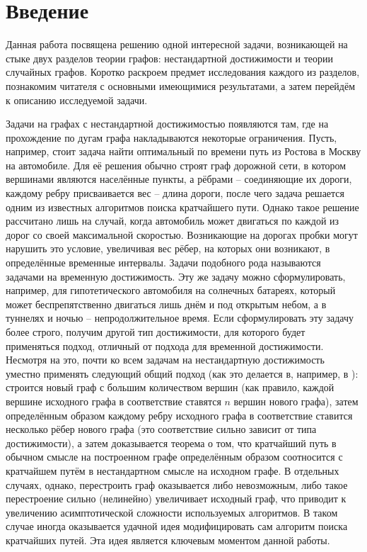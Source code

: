 \section{Введение}

Данная работа посвящена решению одной интересной задачи, возникающей на стыке двух разделов теории графов: нестандартной достижимости и теории случайных графов. Коротко раскроем предмет исследования каждого из разделов, познакомим читателя с основными имеющимися результатами, а затем перейдём к описанию исследуемой задачи.

Задачи на графах с нестандартной достижимостью появляются там, где на прохождение по дугам графа накладываются некоторые ограничения. Пусть, например, стоит задача найти оптимальный по времени путь из Ростова в Москву на автомобиле. Для её решения обычно строят граф дорожной сети, в котором вершинами являются населённые пункты, а рёбрами -- соединяющие их дороги, каждому ребру присваивается вес -- длина дороги, после чего задача решается одним из известных алгоритмов поиска кратчайшего пути. Однако такое решение рассчитано лишь на случай, когда автомобиль может двигаться по каждой из дорог со своей максимальной скоростью. Возникающие на дорогах пробки могут нарушить это условие, увеличивая вес рёбер, на которых они возникают, в определённые временные интервалы. Задачи подобного рода называются задачами на временную достижимость. Эту же задачу можно сформулировать, например, для гипотетического автомобиля на солнечных батареях, который может беспрепятственно двигаться лишь днём и под открытым небом, а в туннелях и ночью -- непродолжительное время. Если сформулировать эту задачу более строго, получим другой тип достижимости, для которого будет применяться подход, отличный от подхода для временной достижимости. Несмотря на это, почти ко всем задачам на нестандартную достижимость уместно применять следующий общий подход (как это делается в, например, в \cite{erus}): строится новый граф с большим количеством вершин (как правило, каждой вершине исходного графа в соответствие ставятся $n$ вершин нового графа), затем определённым образом каждому ребру исходного графа в соответствие ставится несколько рёбер нового графа (это соответствие сильно зависит от типа достижимости), а затем доказывается теорема о том, что кратчайший путь в обычном смысле на построенном графе определённым образом соотносится с кратчайшем путём в нестандартном смысле на исходном графе. В отдельных случаях, однако, перестроить граф оказывается либо невозможным, либо такое перестроение сильно (нелинейно) увеличивает исходный граф, что приводит к увеличению асимптотической сложности используемых алгоритмов. В таком случае иногда оказывается удачной идея модифицировать сам алгоритм поиска кратчайших путей. Эта идея является ключевым моментом данной работы.

